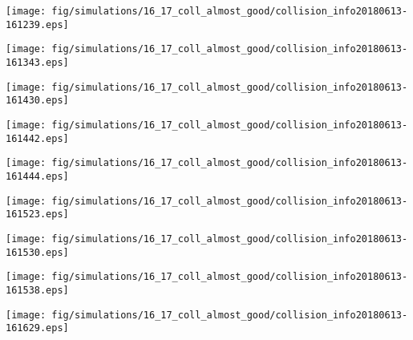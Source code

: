 \texttt{[image: fig/simulations/16\_17\_coll\_almost\_good/collision\_info20180613-161239.eps]}

\texttt{[image: fig/simulations/16\_17\_coll\_almost\_good/collision\_info20180613-161343.eps]}

\texttt{[image: fig/simulations/16\_17\_coll\_almost\_good/collision\_info20180613-161430.eps]}

\texttt{[image: fig/simulations/16\_17\_coll\_almost\_good/collision\_info20180613-161442.eps]}

\texttt{[image: fig/simulations/16\_17\_coll\_almost\_good/collision\_info20180613-161444.eps]}

\texttt{[image: fig/simulations/16\_17\_coll\_almost\_good/collision\_info20180613-161523.eps]}

\texttt{[image: fig/simulations/16\_17\_coll\_almost\_good/collision\_info20180613-161530.eps]}

\texttt{[image: fig/simulations/16\_17\_coll\_almost\_good/collision\_info20180613-161538.eps]}

\texttt{[image: fig/simulations/16\_17\_coll\_almost\_good/collision\_info20180613-161629.eps]}

